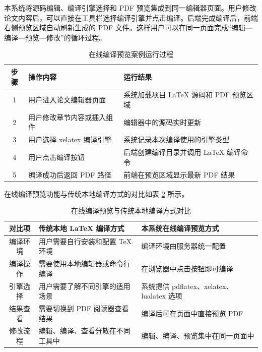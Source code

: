 \documentclass{xduugthesis}
\begin{document}
本系统将源码编辑、编译引擎选择和 PDF 预览集成到同一编辑器页面。用户修改论文内容后，可以直接在工具栏选择编译引擎并点击编译。后端完成编译后，前端右侧预览区域自动刷新生成的 PDF 文件。这样用户可以在同一页面完成“编辑—编译—预览—修改”的循环过程。

\begin{table}[!ht]
    \centering
    \caption{在线编译预览案例运行过程}
    \label{tab:compile-preview-case}
    \begin{tabular}{|c|p{5cm}|p{6cm}|}
        \hline
        步骤 & 操作内容 & 运行结果 \\
        \hline
        1 & 用户进入论文编辑器页面 & 系统加载项目 LaTeX 源码和 PDF 预览区域 \\
        \hline
        2 & 用户修改章节内容或插入组件 & 编辑器中的源码实时更新 \\
        \hline
        3 & 用户选择 xelatex 编译引擎 & 系统记录本次编译使用的引擎类型 \\
        \hline
        4 & 用户点击编译按钮 & 后端创建编译目录并调用 LaTeX 编译命令 \\
        \hline
        5 & 编译成功后返回 PDF 路径 & 前端在预览区域显示最新 PDF 结果 \\
        \hline
    \end{tabular}
\end{table}

在线编译预览功能与传统本地编译方式的对比如表 \ref{tab:compile-compare} 所示。

\begin{table}[!ht]
    \centering
    \caption{在线编译预览与传统本地编译方式对比}
    \label{tab:compile-compare}
    \begin{tabular}{|c|p{5cm}|p{5cm}|}
        \hline
        对比项 & 传统本地 LaTeX 编译方式 & 本系统在线编译预览方式 \\
        \hline
        编译环境 & 用户需要自行安装和配置 TeX 环境 & 编译环境由服务器统一配置 \\
        \hline
        编译操作 & 需要使用本地编辑器或命令行编译 & 在浏览器中点击按钮即可编译 \\
        \hline
        引擎选择 & 用户需要了解不同引擎的适用场景 & 系统提供 pdflatex、xelatex、lualatex 选项 \\
        \hline
        结果查看 & 需要切换到 PDF 阅读器查看结果 & 编译后可在页面中直接预览 PDF \\
        \hline
        修改流程 & 编辑、编译、查看分散在不同工具中 & 编辑、编译、预览集中在同一页面中 \\
        \hline
    \end{tabular}
\end{table}
\end{document}
